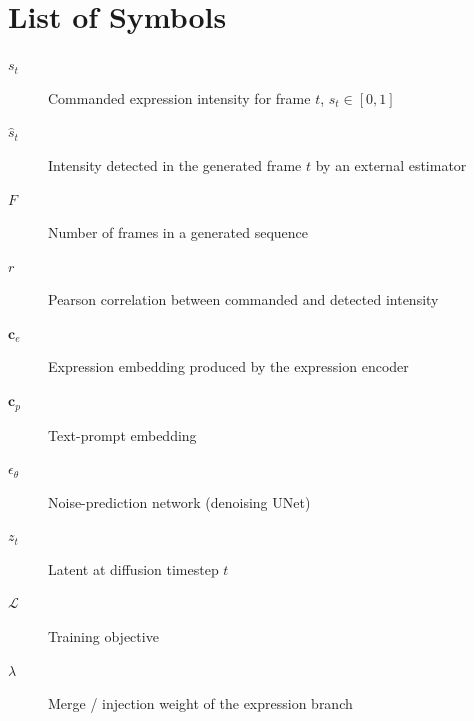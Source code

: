 \chapter*{List of Symbols}


\begin{description}
    \item[$s_t$] Commanded expression intensity for frame $t$, $s_t \in [0,1]$
    \item[$\hat{s}_t$] Intensity detected in the generated frame $t$ by an external estimator
    \item[$F$] Number of frames in a generated sequence
    \item[$r$] Pearson correlation between commanded and detected intensity
    \item[$\mathbf{c}_e$] Expression embedding produced by the expression encoder
    \item[$\mathbf{c}_p$] Text-prompt embedding
    \item[$\epsilon_\theta$] Noise-prediction network (denoising UNet)
    \item[$z_t$] Latent at diffusion timestep $t$
    \item[$\mathcal{L}$] Training objective
    \item[$\lambda$] Merge / injection weight of the expression branch
\end{description}
